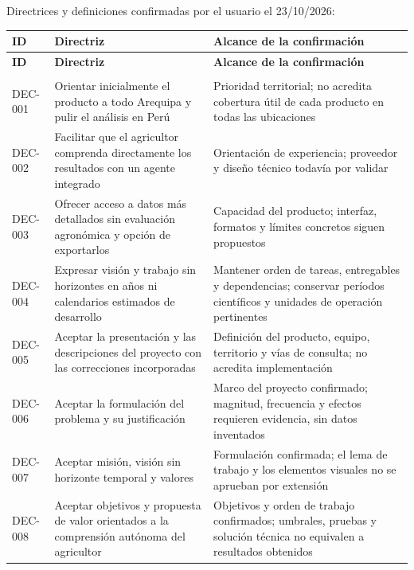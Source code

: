 \documentclass[10pt,a4paper]{article}
\begin{document}
Directrices y definiciones confirmadas por el usuario el 23/\allowbreak{}10/\allowbreak{}2026:


\begingroup\small
\begin{longtable}{>{\raggedright\arraybackslash}p{3.647cm}>{\raggedright\arraybackslash}p{5.867cm}>{\raggedright\arraybackslash}p{6.343cm}}
\toprule
\textbf{ID} & \textbf{Directriz} & \textbf{Alcance de la confirmación} \\
\midrule\endfirsthead
\toprule
\textbf{ID} & \textbf{Directriz} & \textbf{Alcance de la confirmación} \\
\midrule\endhead
\midrule\multicolumn{3}{r}{\scriptsize Continúa en la página siguiente}\\\endfoot
\bottomrule\endlastfoot
DEC-001 & Orientar inicialmente el producto a todo Arequipa y pulir el análisis en Perú & Prioridad territorial; no acredita cobertura útil de cada producto en todas las ubicaciones \\[3pt]
DEC-002 & Facilitar que el agricultor comprenda directamente los resultados con un agente integrado & Orientación de experiencia; proveedor y diseño técnico todavía por validar \\[3pt]
DEC-003 & Ofrecer acceso a datos más detallados sin evaluación agronómica y opción de exportarlos & Capacidad del producto; interfaz, formatos y límites concretos siguen propuestos \\[3pt]
DEC-004 & Expresar visión y trabajo sin horizontes en años ni calendarios estimados de desarrollo & Mantener orden de tareas, entregables y dependencias; conservar períodos científicos y unidades de operación pertinentes \\[3pt]
DEC-005 & Aceptar la presentación y las descripciones del proyecto con las correcciones incorporadas & Definición del producto, equipo, territorio y vías de consulta; no acredita implementación \\[3pt]
DEC-006 & Aceptar la formulación del problema y su justificación & Marco del proyecto confirmado; magnitud, frecuencia y efectos requieren evidencia, sin datos inventados \\[3pt]
DEC-007 & Aceptar misión, visión sin horizonte temporal y valores & Formulación confirmada; el lema de trabajo y los elementos visuales no se aprueban por extensión \\[3pt]
DEC-008 & Aceptar objetivos y propuesta de valor orientados a la comprensión autónoma del agricultor & Objetivos y orden de trabajo confirmados; umbrales, pruebas y solución técnica no equivalen a resultados obtenidos \\[3pt]
\end{longtable}
\endgroup
\end{document}
